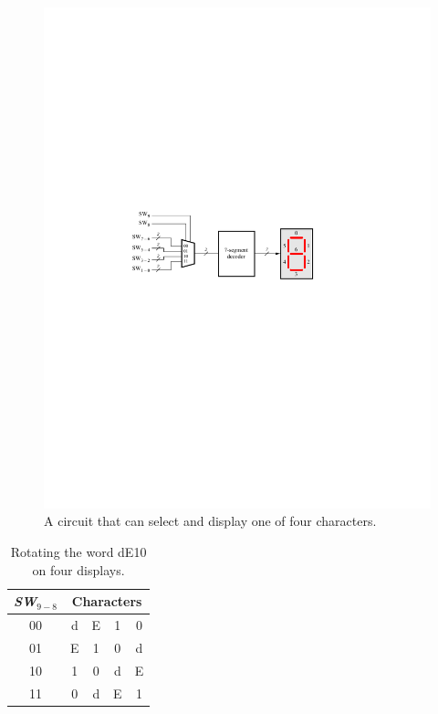\documentclass[epsfig,10pt,fullpage]{article}
\begin{document}
\begin{figure}[H]
	\begin{center}
		\includegraphics[]{figures/figure7.pdf}
	\end{center}
\caption{A circuit that can select and display one of four characters.}
\label{fig:7}
\end{figure}

\begin{table}[H]
\begin{minipage}[t]{12.5 cm}
\begin{center}
\begin{tabular}{c|cccc}
{\it SW}$_{9-8}$ & \multicolumn{4}{c}{Characters} \\
\hline
{\rule[0mm]{0mm}{5mm}00} & d & E & 1 & 0\\ 
01 & E & 1 & 0 & d\\
10 & 1 & 0 & d & E\\
11 & 0 & d & E & 1\\
\end{tabular}
\end{center}
\end{minipage}
\caption{Rotating the word dE10 on four displays.}
\label{tab:rotate}
\end{table}
\end{document}
